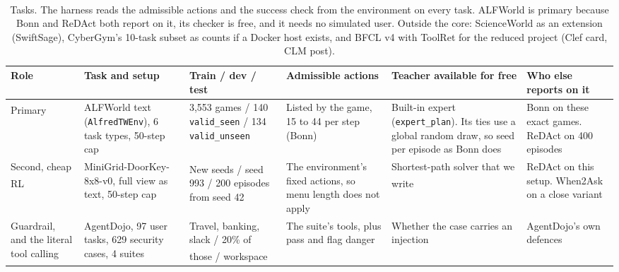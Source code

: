\documentclass[10pt]{article}
\newcommand{\my}{\textsuperscript{\textcolor{blue!70!black}{\dag}}}
\begin{document}
\begin{table}[H]
\footnotesize
\caption{Tasks. The harness reads the admissible actions and the success check from the environment on every task. ALFWorld is primary\my{} because Bonn and ReDAct both report on it, its checker is free, and it needs no simulated user. Outside the core: ScienceWorld as an extension (SwiftSage), CyberGym's 10-task subset as counts if a Docker host exists, and BFCL v4 with ToolRet for the reduced project (Clef card, CLM post).}
\label{t:tasks}
\begin{tabularx}{\linewidth}{@{}P{2cm} P{4.6cm} P{3.6cm} P{3.2cm} L P{3cm}@{}}
\toprule
Role & Task and setup & Train / dev / test & Admissible actions & Teacher available for free & Who else reports on it \\
\midrule
Primary\my & ALFWorld text (\texttt{AlfredTWEnv}), 6 task types, 50-step cap & 3,553 games / 140 \texttt{valid\_seen} / 134 \texttt{valid\_unseen} & Listed by the game, 15 to 44 per step (Bonn) & Built-in expert (\texttt{expert\_plan}). Its ties use a global random draw, so seed per episode as Bonn does & Bonn on these exact games. ReDAct on 400 episodes \\
Second, cheap RL\my & MiniGrid-DoorKey-8x8-v0, full view as text, 50-step cap & New seeds\my{} / seed 993 / 200 episodes from seed 42 & The environment's fixed actions, so menu length does not apply & Shortest-path solver that we write\my & ReDAct on this setup. When2Ask on a close variant \\
Guardrail, and the literal tool calling & AgentDojo, 97 user tasks, 629 security cases, 4 suites & Travel, banking, slack / 20\% of those\my{} / workspace\my & The suite's tools, plus pass and flag danger & Whether the case carries an injection & AgentDojo's own defences \\
\bottomrule
\end{tabularx}
\end{table}
\end{document}
